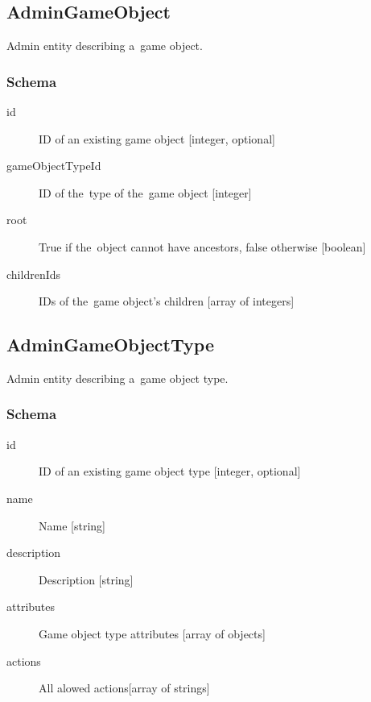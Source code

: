 	\subsection{AdminGameObject}
		\label{json:admingameobject}
		Admin entity describing a~game object.
		\subsubsection{Schema}
			\begin{description}
				\item[id] ID of an existing game object [integer, optional]
				\item[gameObjectTypeId] ID of the~type of the~game object [integer]
				\item[root] True if the~object cannot have ancestors, false otherwise [boolean]
				\item[childrenIds] IDs of the~game object's children [array of integers]
			\end{description}
			
	\subsection{AdminGameObjectType}
		\label{json:admingameobjecttype}
		Admin entity describing a~game object type.
		\subsubsection{Schema}
			\begin{description}
				\item[id] ID of an existing game object type [integer, optional]
				\item[name] Name [string]
				\item[description] Description [string]
				\item[attributes] Game object type attributes [array of objects]
				\item[actions] All alowed actions[array of strings]
			\end{description}
		
	

